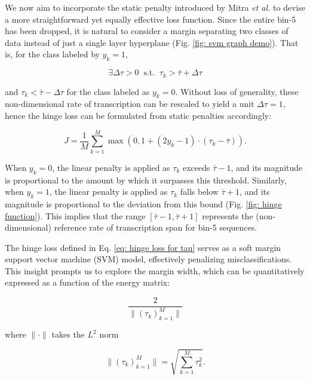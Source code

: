 \documentclass{article}
\begin{document}
We now aim to incorporate the static penalty introduced by Mitra \textit{et al.} \cite{Mitra2018NatCommun} to devise a more straightforward yet equally effective loss function. Since the entire bin-5 has been dropped, it is natural to consider a margin separating two classes of data instead of just a single layer hyperplane (Fig. \ref{fig: svm graph demo}). That is, for the class labeled by $y_k=1$, 

\begin{equation}
    \exists \Delta\tau>0 \;\; \text{s.t.} \;\; \tau_k >\bar{\tau}+\Delta\tau
\end{equation}

\noindent and $\tau_k<\bar{\tau}-\Delta\tau$ for the class labeled as $y_k=0$. Without loss of generality, these non-dimensional rate of transcription can be rescaled to yield a unit $\Delta\tau=1$, hence the hinge loss can be formulated from static penalties accordingly:

\begin{equation}\label{eq: hinge loss for tau}
    J = \frac{1}{M}\sum_{k=1}^M \max{(0,1+(2y_k-1)\cdot(\tau_k-\bar{\tau}))}.
\end{equation}

When $y_k=0$, the linear penalty is applied as $\tau_k$ exceeds $\bar{\tau}-1$, and its magnitude is proportional to the amount by which it surpasses this threshold. Similarly, when $y_k=1$, the linear penalty is applied as $\tau_k$ falls below $\bar{\tau}+1$, and its magnitude is proportional to the deviation from this bound (Fig. \ref{fig: hinge function}). This implies that the range $[\bar{\tau}-1,\bar{\tau}+1]$ represents the (non-dimensional) reference rate of transcription span for bin-5 sequences.

The hinge loss defined in Eq. \ref{eq: hinge loss for tau} serves as a soft margin support vector machine (SVM) model, effectively penalizing misclassifications. This insight prompts us to explore the margin width, which can be quantitatively expressed as a function of the energy matrix:

\begin{equation}
    \frac{2}{\|(\tau_k)_{k=1}^M\|}
\end{equation}

\noindent where $\|\cdot\|$ takes the $L^2$ norm

\begin{equation}
    \|(\tau_k)_{k=1}^M\| = \sqrt{\sum_{k=1}^M \tau_k^2}.
\end{equation}
\end{document}

